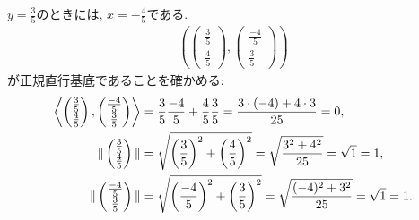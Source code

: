 \begin{checkanswer}%
  $y=\frac{3}{5}$のときには,
  $x=-\frac{4}{5}$である.
  \begin{align*}
    (\begin{pmatrix}\frac{3}{5}\\\frac{4}{5}\end{pmatrix},
    \begin{pmatrix}\frac{-4}{5}\\\frac{3}{5}\end{pmatrix})
  \end{align*}
  が正規直行基底であることを確かめる:
  \begin{align*}
    \Braket{\begin{pmatrix}\frac{3}{5}\\\frac{4}{5}\end{pmatrix},
    \begin{pmatrix}\frac{-4}{5}\\\frac{3}{5}\end{pmatrix}}
    &=\frac{3}{5}\frac{-4}{5}+\frac{4}{5}\frac{3}{5}
    =\frac{3\cdot(-4)+4\cdot3}{25}
    =0,\\
    \|\begin{pmatrix}\frac{3}{5}\\\frac{4}{5}\end{pmatrix}\|
    &=\sqrt{\left(\frac{3}{5}\right)^2+\left(\frac{4}{5}\right)^2}
    =\sqrt{\frac{3^2+4^2}{25}}
    =\sqrt{1}=1,\\
    \|\begin{pmatrix}\frac{-4}{5}\\\frac{3}{5}\end{pmatrix}\|
    &=\sqrt{\left(\frac{-4}{5}\right)^2+\left(\frac{3}{5}\right)^2}
    =\sqrt{\frac{(-4)^2+3^2}{25}}
    =\sqrt{1}=1.
  \end{align*}
  


\end{checkanswer}
